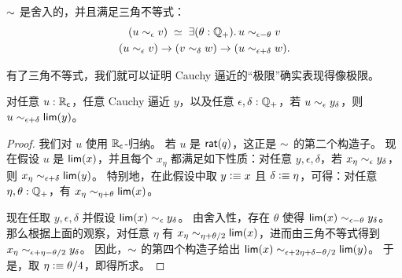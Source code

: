 \begin{cor}
  $\mathord\sim$ 是舍入的，并且满足三角不等式：
    \begin{gather}
      \eqvspaced{
        (u \close\epsilon v)
      }{
        \exis{\theta : \Qp} u \close{\epsilon - \theta} v
      }\\
      (u\close\epsilon v) \to (v\close\delta w) \to (u\close{\epsilon+\delta} w). \label{item:RC-sim-triangle}
    \end{gather}
\end{cor}



有了三角不等式，我们就可以证明 Cauchy 逼近的``极限''确实表现得像极限。

\begin{lem}\label{thm:RC-sim-lim}
  对任意 $u:\mathbb{R}_\mathsf{c}$，任意 Cauchy 逼近 $y$，以及任意 $\epsilon,\delta:\mathbb{Q}_{+}$，若 $u\sim_{\epsilon} y_\delta$，则 $u\sim_{\epsilon+\delta} \mathsf{lim}(y)$。
\end{lem}

\begin{proof}
  我们对 $u$ 使用 $\mathbb{R}_\mathsf{c}$-归纳。
  若 $u$ 是 $\mathsf{rat}(q)$，这正是 $\mathord\sim$ 的第二个构造子。
  现在假设 $u$ 是 $\mathsf{lim}(x)$，并且每个 $x_\eta$ 都满足如下性质：对任意 $y,\epsilon,\delta$，若 $x_\eta\sim_{\epsilon} y_\delta$，则 $x_\eta \sim_{\epsilon+\delta} \mathsf{lim}(y)$。
  特别地，在此假设中取 $y\vcentcolon\equiv x$ 且 $\delta\vcentcolon\equiv\eta$，可得：对任意 $\eta,\theta:\mathbb{Q}_{+}$，有 $x_\eta \sim_{\eta+\theta} \mathsf{lim}(x)$。

  现在任取 $y,\epsilon,\delta$ 并假设 $\mathsf{lim}(x) \sim_{\epsilon} y_\delta$。
  由舍入性，存在 $\theta$ 使得 $\mathsf{lim}(x) \sim_{\epsilon-\theta} y_\delta$。
  那么根据上面的观察，对任意 $\eta$ 有 $x_\eta \sim_{\eta+\theta/2} \mathsf{lim}(x)$，进而由三角不等式得到 $x_\eta \sim_{\epsilon+\eta-\theta/2} y_\delta$。
  因此，$\mathord\sim$ 的第四个构造子给出 $\mathsf{lim}(x) \sim_{\epsilon+2\eta+\delta-\theta/2} \mathsf{lim}(y)$。
  于是，取 $\eta \vcentcolon\equiv \theta/4$，即得所求。
\end{proof}

